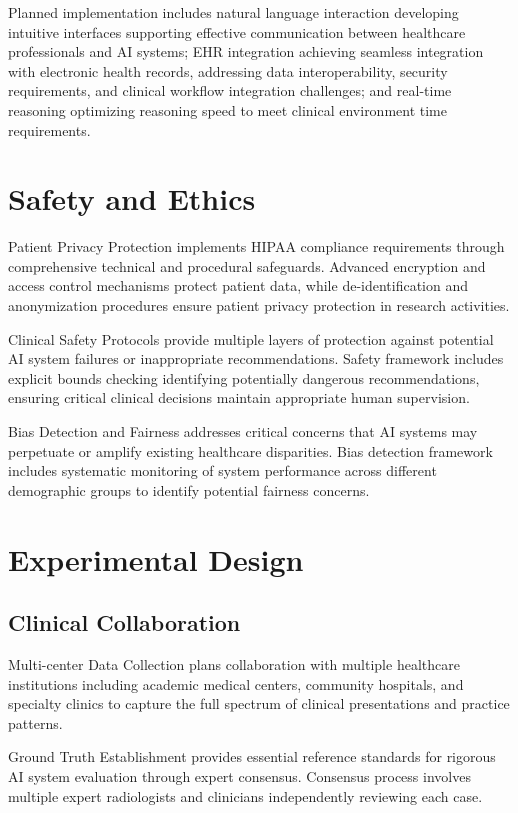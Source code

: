 Planned implementation includes natural language interaction developing intuitive interfaces supporting effective communication between healthcare professionals and AI systems; EHR integration achieving seamless integration with electronic health records, addressing data interoperability, security requirements, and clinical workflow integration challenges; and real-time reasoning optimizing reasoning speed to meet clinical environment time requirements.

\section{Safety and Ethics}

Patient Privacy Protection implements HIPAA compliance requirements through comprehensive technical and procedural safeguards. Advanced encryption and access control mechanisms protect patient data, while de-identification and anonymization procedures ensure patient privacy protection in research activities.

Clinical Safety Protocols provide multiple layers of protection against potential AI system failures or inappropriate recommendations. Safety framework includes explicit bounds checking identifying potentially dangerous recommendations, ensuring critical clinical decisions maintain appropriate human supervision.

Bias Detection and Fairness addresses critical concerns that AI systems may perpetuate or amplify existing healthcare disparities. Bias detection framework includes systematic monitoring of system performance across different demographic groups to identify potential fairness concerns.

\section{Experimental Design}

\subsection{Clinical Collaboration}

Multi-center Data Collection plans collaboration with multiple healthcare institutions including academic medical centers, community hospitals, and specialty clinics to capture the full spectrum of clinical presentations and practice patterns.

Ground Truth Establishment provides essential reference standards for rigorous AI system evaluation through expert consensus. Consensus process involves multiple expert radiologists and clinicians independently reviewing each case.

